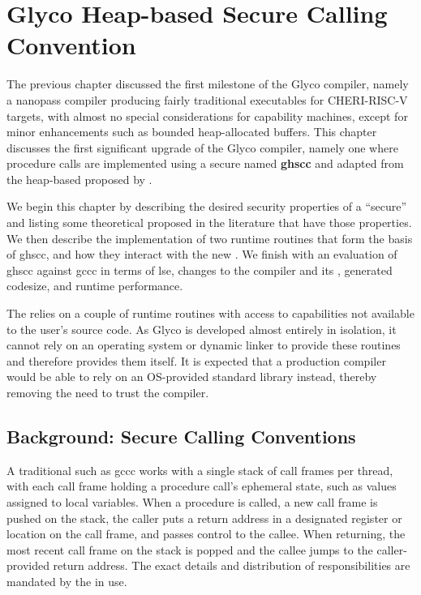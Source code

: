 \documentclass[main.tex]{subfiles}
\begin{document}
\onlyinsubfile{\mainmatter{}}

\chapter{Glyco Heap-based Secure Calling Convention}
The previous chapter discussed the first milestone of the Glyco compiler, namely a nanopass compiler producing fairly traditional executables for CHERI-RISC-V targets, with almost no special considerations for capability machines, except for minor enhancements such as bounded heap-allocated buffers. This chapter discusses the first significant upgrade of the Glyco compiler, namely one where procedure calls are implemented using a secure \cc{} named \textbf{\gls{ghscc}} and adapted from the heap-based \cc{} proposed by \cite{cerise}.

We begin this chapter by describing the desired security properties of a \enquote{secure} \cc{} and listing some theoretical \ccs{} proposed in the literature that have those properties. We then describe the implementation of two runtime routines that form the basis of \gls{ghscc}, and how they interact with the new \cc{}. We finish with an evaluation of \gls{ghscc} against \gls{gccc} in terms of \gls{lse}, changes to the compiler and its \ils{}, generated codesize, and runtime performance.

The \cc{} relies on a couple of runtime routines with access to capabilities not available to the user's source code. As Glyco is developed almost entirely in isolation, it cannot rely on an operating system or dynamic linker to provide these routines and therefore provides them itself. It is expected that a production compiler would be able to rely on an OS-provided standard library instead, thereby removing the need to trust the compiler.

\section{Background: Secure Calling Conventions}
A traditional \cc{} such as \gls{gccc} works with a single stack of call frames per thread, with each call frame holding a procedure call's ephemeral state, such as values assigned to local variables. When a procedure is called, a new call frame is pushed on the stack, the caller puts a return address in a designated register or location on the call frame, and passes control to the callee. When returning, the most recent call frame on the stack is popped and the callee jumps to the caller-provided return address. The exact details and distribution of responsibilities are mandated by the \cc{} in use.
\end{document}

